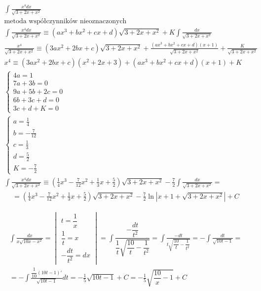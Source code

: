 
\begin{gather*}
  \int \frac{x^4dx}{\sqrt{3+2x+x^2}} \\
  \text{metoda współczynników nieoznaczonych} \\
  \int \frac{x^4dx}{\sqrt{3+2x+x^2}} \equiv (ax^3+bx^2+cx+d)\sqrt{3+2x+x^2}+K\int \frac{dx}{\sqrt{3+2x+x^2}} \\
 \frac{x^4}{\sqrt{3+2x+x^2}} \equiv (3ax^2+2bx+c)\sqrt{3+2x+x^2} + \frac{(ax^3+bx^2+cx+d)(x+1)}{\sqrt{3+2x+x^2}}+\frac{K}{\sqrt{3+2x+x^2}} \\
x^4 \equiv (3ax^2+2bx+c)(x^2+2x+3) + (ax^3+bx^2+cx+d)(x+1)+K \\
\begin{cases} 4a=1 \\ 7a+3b=0 \\ 9a+5b+2c=0 \\ 6b+3c+d=0 \\ 3c+d+K=0 \end{cases} \\
\begin{cases} a=\frac{1}{4} \\ b=-\frac{7}{12} \\ c=\frac{1}{3} \\ d=\frac{5}{2} \\ K=-\frac{7}{2} \end{cases} \\
\int \frac{x^4dx}{\sqrt{3+2x+x^2}} \equiv (\frac{1}{4}x^3-\frac{7}{12}x^2+\frac{1}{3}x+\frac{5}{2})\sqrt{3+2x+x^2}-\frac{7}{2}\int \frac{dx}{\sqrt{3+2x+x^2}} = \end{gather*}
\begin{gather*}= (\frac{1}{4}x^3-\frac{7}{12}x^2+\frac{1}{3}x+\frac{5}{2})\sqrt{3+2x+x^2}- \frac{7}{2}\ln|x+1+\sqrt{3+2x+x^2}|+C\end{gather*}



\begin{gather*}
  \int \frac{dx}{x\sqrt{10x-x^2}} =
  \begin{vmatrix}
    t=\dfrac{1}{x} \\
    \dfrac{1}{t}=x \\
    -\dfrac{dt}{t^2}=dx
  \end{vmatrix}
  = \int \dfrac{-\dfrac{dt}{t^2}}{\dfrac{1}{t}\sqrt{\dfrac{10}{t}-\dfrac{1}{t^2}}}
  = \int \frac{-dt}{t\sqrt{\dfrac{10}{t}-\dfrac{1}{t^2}}}
  = -\int \frac{dt}{\sqrt{10t-1}} = \\
  = - \int \frac{\dfrac{1}{10}(10t-1)'}{\sqrt{10t-1}}dt
  = -\frac{1}{5}\sqrt{10t-1}+C
  = -\frac{1}{5}\sqrt{\dfrac{10}{x}-1}+C
\end{gather*}

